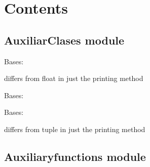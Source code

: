 \documentclass[letterpaper,10pt,english]{sphinxmanual}
\begin{document}
\section{Contents}
\label{Analisis/modules:contents}

\subsection{AuxiliarClases module}
\label{Analisis/AuxiliarClases:module-AuxiliarClases}\label{Analisis/AuxiliarClases::doc}\label{Analisis/AuxiliarClases:auxiliarclases-module}

\begin{fulllineitems}
\label{Analisis/AuxiliarClases:AuxiliarClases.MyFloat}
Bases: 

differs from float in just the printing method

\end{fulllineitems}


\begin{fulllineitems}
\label{Analisis/AuxiliarClases:AuxiliarClases.MyInnerTuple}
Bases: 

\end{fulllineitems}


\begin{fulllineitems}
\label{Analisis/AuxiliarClases:AuxiliarClases.MyTuple}
Bases: 

differs from tuple in just the printing method

\end{fulllineitems}



\subsection{Auxiliaryfunctions module}
\label{Analisis/Auxiliaryfunctions:auxiliaryfunctions-module}\label{Analisis/Auxiliaryfunctions:module-Auxiliaryfunctions}\label{Analisis/Auxiliaryfunctions::doc}
\end{document}
